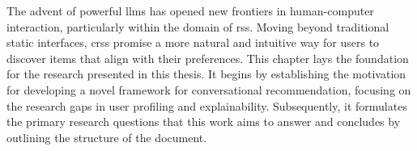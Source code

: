 The advent of powerful \aclp{llm} has opened new frontiers in human-computer interaction, particularly within the domain of \aclp{rs}. Moving beyond traditional static interfaces, \acp{crs} promise a more natural and intuitive way for users to discover items that align with their preferences. This chapter lays the foundation for the research presented in this thesis. It begins by establishing the motivation for developing a novel framework for conversational recommendation, focusing on the research gaps in user profiling and explainability. Subsequently, it formulates the primary research questions that this work aims to answer and concludes by outlining the structure of the document.